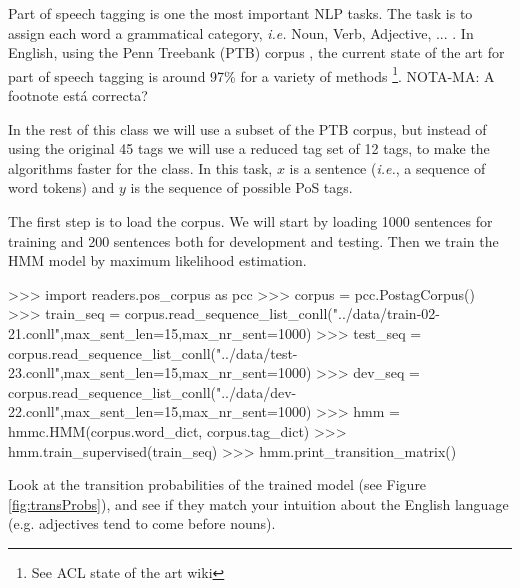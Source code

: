 Part of speech tagging is one the most important NLP tasks. The
task is to assign each word a grammatical category, \emph{i.e.} Noun,
Verb, Adjective, ... . In English, using the Penn Treebank (PTB) corpus \citep{pennTreeBank}, the current
state of the art for part of speech tagging is around 97\% for a
variety of methods \footnote{See ACL state of the art wiki}. 
NOTA-MA: A footnote está correcta?

In the rest of this class we will use a subset of the PTB corpus, but
instead of using the original 45 tags we will use a reduced tag set of
12 tags, to make the algorithms faster for the
class. In this task, $x$ is a sentence (\emph{i.e.}, a sequence of word tokens) and $y$
is the sequence of possible PoS tags.

The first step is to load the corpus. We will start by loading
1000 sentences for training and 200 sentences both for development and
testing. Then we train the HMM model by maximum 
likelihood estimation.
\begin{python}
>>> import readers.pos_corpus as pcc
>>> corpus = pcc.PostagCorpus()
>>> train_seq = corpus.read_sequence_list_conll("../data/train-02-21.conll",max_sent_len=15,max_nr_sent=1000)
>>> test_seq = corpus.read_sequence_list_conll("../data/test-23.conll",max_sent_len=15,max_nr_sent=1000)
>>> dev_seq = corpus.read_sequence_list_conll("../data/dev-22.conll",max_sent_len=15,max_nr_sent=1000)
>>> hmm = hmmc.HMM(corpus.word_dict, corpus.tag_dict)
>>> hmm.train_supervised(train_seq)
>>> hmm.print_transition_matrix()
\end{python}


Look at the transition probabilities of the trained model
 (see
Figure \ref{fig:transProbs}), and see if they match your intuition
about the English language (e.g. adjectives tend to come before nouns).

